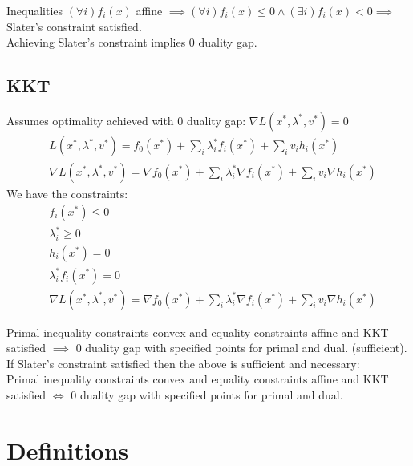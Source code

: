 \documentclass[8pt]{report}
\begin{document}
\begin{multicols*}{2}
  Inequalities $(\forall i)f_i(x)$ affine $\implies (\forall i)f_i(x) \leq 0 \wedge (\exists i) f_i(x) < 0 \implies$ Slater's constraint satisfied.\\
  
  Achieving Slater's constraint implies 0 duality gap.
  \subsection{KKT}
  Assumes optimality achieved with 0 duality gap: $\nabla L(x^*,\lambda^*,v^*)=0$
  \begin{align*}
    &L(x^*,\lambda^*,v^*) = f_0(x^*) + \sum_i \lambda_i^* f_i(x^*) + \sum_i v_i h_i(x^*)\\
    &\nabla L(x^*,\lambda^*,v^*) = \nabla f_0(x^*) + \sum_i \lambda_i^* \nabla f_i(x^*) + \sum_i v_i \nabla h_i(x^*)
  \end{align*}
  We have the constraints:
  \begin{align*}
    &f_i(x^*) \leq 0\\
    &\lambda_i^* \geq 0\\
    &h_i(x^*)=0\\
    &\lambda_i^* f_i(x^*)=0\\
    &\nabla L(x^*,\lambda^*,v^*) = \nabla f_0(x^*) + \sum_i \lambda_i^* \nabla f_i(x^*) + \sum_i v_i \nabla h_i(x^*)
  \end{align*}

  Primal inequality constraints convex and equality constraints affine and KKT satisfied $\implies$ 0 duality gap with specified points for primal and dual. (sufficient).\\

  If Slater's constraint satisfied then the above is sufficient and necessary:\\
  Primal inequality constraints convex and equality constraints affine and KKT satisfied $\iff$ 0 duality gap with specified points for primal and dual.\\
  
  \vfill\null
  
  \pagebreak
  
  \section{Definitions}


\end{multicols*}
\end{document}
